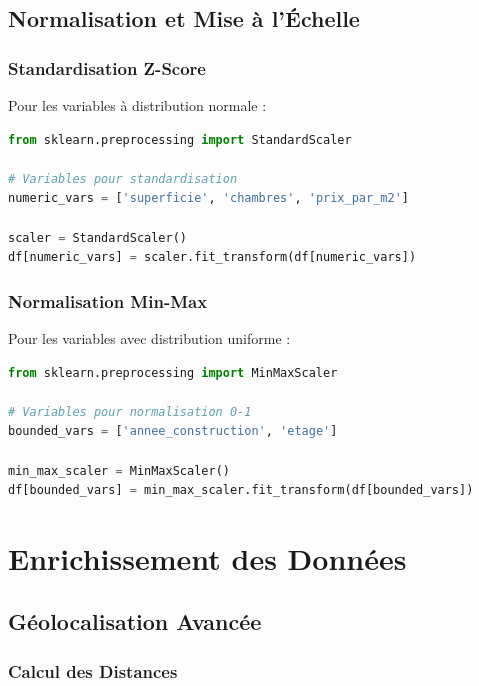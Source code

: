 \subsection{Normalisation et Mise à l'Échelle}
\label{subsec:normalisation_echelle}

\subsubsection{Standardisation Z-Score}

Pour les variables à distribution normale :

\begin{lstlisting}[language=Python,caption=Standardisation Z-Score]
from sklearn.preprocessing import StandardScaler

# Variables pour standardisation
numeric_vars = ['superficie', 'chambres', 'prix_par_m2']

scaler = StandardScaler()
df[numeric_vars] = scaler.fit_transform(df[numeric_vars])
\end{lstlisting}

\subsubsection{Normalisation Min-Max}

Pour les variables avec distribution uniforme :

\begin{lstlisting}[language=Python,caption=Normalisation Min-Max]
from sklearn.preprocessing import MinMaxScaler

# Variables pour normalisation 0-1
bounded_vars = ['annee_construction', 'etage']

min_max_scaler = MinMaxScaler()
df[bounded_vars] = min_max_scaler.fit_transform(df[bounded_vars])
\end{lstlisting}

\section{Enrichissement des Données}
\label{sec:enrichissement_donnees}

\subsection{Géolocalisation Avancée}
\label{subsec:geolocalisation_avancee}

\subsubsection{Calcul des Distances}


